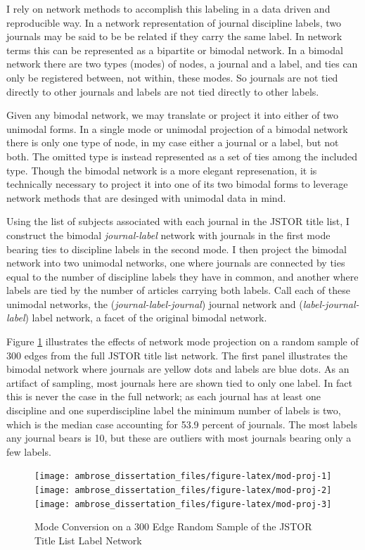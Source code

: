 \documentclass[]{book}
\theoremstyle{definition}
\theoremstyle{definition}
\theoremstyle{definition}
\theoremstyle{remark}
\begin{document}
I rely on network methods to accomplish this labeling in a data driven
and reproducible way. In a network representation of journal discipline
labels, two journals may be said to be be related if they carry the same
label. In network terms this can be represented as a bipartite or
bimodal network. In a bimodal network there are two types (modes) of
nodes, a journal and a label, and ties can only be registered between,
not within, these modes. So journals are not tied directly to other
journals and labels are not tied directly to other labels.

Given any bimodal network, we may translate or project it into either of
two unimodal forms. In a single mode or unimodal projection of a bimodal
network there is only one type of node, in my case either a journal or a
label, but not both. The omitted type is instead represented as a set of
ties among the included type. Though the bimodal network is a more
elegant represenation, it is technically necessary to project it into
one of its two bimodal forms to leverage network methods that are
desinged with unimodal data in mind.

Using the list of subjects associated with each journal in the JSTOR
title list, I construct the bimodal \emph{journal-label} network with
journals in the first mode bearing ties to discipline labels in the
second mode. I then project the bimodal network into two unimodal
networks, one where journals are connected by ties equal to the number
of discipline labels they have in common, and another where labels are
tied by the number of articles carrying both labels. Call each of these
unimodal networks, the (\emph{journal-label-journal}) journal network
and (\emph{label-journal-label}) label network, a facet of the original
bimodal network.

Figure \ref{fig:mod-proj} illustrates the effects of network mode
projection on a random sample of 300 edges from the full JSTOR title
list network. The first panel illustrates the bimodal network where
journals are yellow dots and labels are blue dots. As an artifact of
sampling, most journals here are shown tied to only one label. In fact
this is never the case in the full network; as each journal has at least
one discipline and one superdiscipline label the minimum number of
labels is two, which is the median case accounting for 53.9 percent of
journals. The most labels any journal bears is 10, but these are
outliers with most journals bearing only a few labels.

\begin{figure}

{\centering \texttt{[image: ambrose\_dissertation\_files/figure-latex/mod-proj-1]} \texttt{[image: ambrose\_dissertation\_files/figure-latex/mod-proj-2]} \texttt{[image: ambrose\_dissertation\_files/figure-latex/mod-proj-3]} 

}

\caption{Mode Conversion on a 300 Edge Random Sample of the JSTOR Title List Label Network}\label{fig:mod-proj}
\end{figure}
\end{document}
